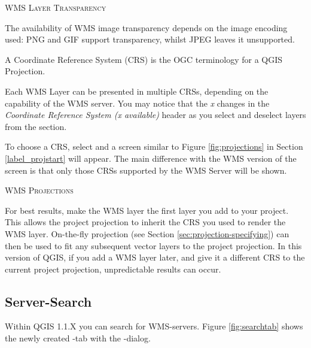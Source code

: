 \begin{Tip}[ht]\caption{\textsc{WMS Layer Transparency}}
The availability of WMS image transparency depends on
the image encoding used:  PNG and GIF support transparency,
whilst JPEG leaves it unsupported.
\end{Tip}


A Coordinate Reference System (CRS) is the OGC terminology for a QGIS Projection.

Each WMS Layer can be presented in multiple CRSs, depending
on the capability of the WMS server.  You may notice that the \textsl{x} changes in
the \textsl{Coordinate Reference System (x available)} header as you
select and deselect layers from the  section.

To choose a CRS, select  and a screen similar to
Figure \ref{fig:projections} in Section \ref{label_projstart} will appear.
The main difference with the WMS version of the screen is that only
those CRSs supported by the WMS Server will be shown.


\begin{Tip}[ht]\caption{\textsc{WMS Projections}}
For best results, make the WMS layer the first layer
you add to your project.  This allows the project
projection to inherit the CRS you used to render the WMS layer.
On-the-fly projection (see Section \ref{sec:projection-specifying})
can then be used to fit any subsequent
vector layers to the project projection.
In this version of QGIS, if you add a WMS layer later, and give it a different
CRS to the current project projection, unpredictable
results can occur.
\end{Tip}

% 
%
\subsection{Server-Search}
\label{sec:serversearch}

Within QGIS 1.1.X you can search for WMS-servers. 
Figure \ref{fig:searchtab} shows the newly created -tab with
the -dialog.

